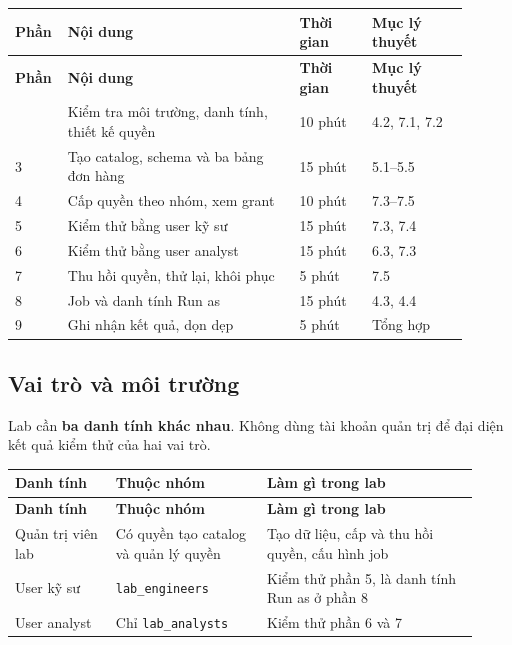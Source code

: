 \begingroup\small
\renewcommand{\arraystretch}{1.2}
\begin{longtable}{@{}p{0.07\linewidth}p{0.48\linewidth}p{0.15\linewidth}p{0.2\linewidth}@{}}
\toprule
\rowcolor{rowLavender}
\textbf{Phần} & \textbf{Nội dung} & \textbf{Thời gian} & \textbf{Mục lý thuyết} \\
\midrule
\endfirsthead
\toprule
\rowcolor{rowLavender}
\textbf{Phần} & \textbf{Nội dung} & \textbf{Thời gian} & \textbf{Mục lý thuyết} \\
\midrule
\endhead
\bottomrule
\endfoot
2 & Kiểm tra môi trường, danh tính, thiết kế quyền & 10 phút & 4.2, 7.1, 7.2 \\
3 & Tạo catalog, schema và ba bảng đơn hàng & 15 phút & 5.1--5.5 \\
4 & Cấp quyền theo nhóm, xem grant & 10 phút & 7.3--7.5 \\
5 & Kiểm thử bằng user kỹ sư & 15 phút & 7.3, 7.4 \\
6 & Kiểm thử bằng user analyst & 15 phút & 6.3, 7.3 \\
7 & Thu hồi quyền, thử lại, khôi phục & 5 phút & 7.5 \\
8 & Job và danh tính Run as & 15 phút & 4.3, 4.4 \\
9 & Ghi nhận kết quả, dọn dẹp & 5 phút & Tổng hợp \\
\end{longtable}
\endgroup

\subsection{Vai trò và môi trường}

Lab cần \textbf{ba danh tính khác nhau}. Không dùng tài khoản quản trị để đại diện kết quả kiểm thử của hai vai trò.


\begingroup\small
\renewcommand{\arraystretch}{1.2}
\begin{longtable}{@{}p{0.2\linewidth}p{0.3\linewidth}p{0.42\linewidth}@{}}
\toprule
\rowcolor{rowLavender}
\textbf{Danh tính} & \textbf{Thuộc nhóm} & \textbf{Làm gì trong lab} \\
\midrule
\endfirsthead
\toprule
\rowcolor{rowLavender}
\textbf{Danh tính} & \textbf{Thuộc nhóm} & \textbf{Làm gì trong lab} \\
\midrule
\endhead
\bottomrule
\endfoot
Quản trị viên lab & Có quyền tạo catalog và quản lý quyền & Tạo dữ liệu, cấp và thu hồi quyền, cấu hình job \\
User kỹ sư & \texttt{lab\_\allowbreak{}engineers} & Kiểm thử phần 5, là danh tính Run as ở phần 8 \\
User analyst & Chỉ \texttt{lab\_\allowbreak{}analysts} & Kiểm thử phần 6 và 7 \\
\end{longtable}
\endgroup

